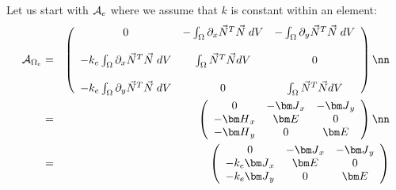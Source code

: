
Let us start with ${\cal A}_e$ where we assume that $k$ is constant within an element:
\begin{eqnarray}
{\cal A}_{\Omega_e}
&=&
\left(
\begin{array}{ccc}
0 & - \int_{\Omega} \partial_x \vec{N}^T \vec{N}   \; dV  & - \int_{\Omega} \partial_y \vec{N}^T \vec{N}   \; dV  \\ \\
-k_e \int_\Omega \partial_x \vec{N}^T \vec{N} \; dV & \int_\Omega \vec{N}^T\vec{N} dV & 0 \\  \\
-k_e \int_\Omega \partial_y \vec{N}^T \vec{N} \; dV & 0 & \int_\Omega \vec{N}^T\vec{N} dV  
\end{array}
\right) \nn\\
&=&
\left(
\begin{array}{ccc}
0 & -{\bm J}_x & -{\bm J}_y \\
-{\bm H}_x & {\bm E} & 0 \\
-{\bm H}_y & 0 & {\bm E} 
\end{array}
\right) \nn\\
&=&
\left(
\begin{array}{ccc}
0 & -{\bm J}_x & -{\bm J}_y \\
-k_e{\bm J}_x & {\bm E} & 0 \\
-k_e{\bm J}_y & 0 & {\bm E} 
\end{array}
\right)
\end{eqnarray}

